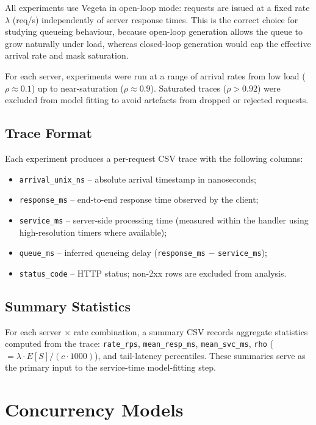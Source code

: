 All experiments use Vegeta in open-loop mode: requests are issued at a fixed rate $\lambda$ (req/s) independently of server response times. This is the correct choice for studying queueing behaviour, because open-loop generation allows the queue to grow naturally under load, whereas closed-loop generation would cap the effective arrival rate and mask saturation.

For each server, experiments were run at a range of arrival rates from low load ($\rho \approx 0.1$) up to near-saturation ($\rho \approx 0.9$). Saturated traces ($\rho > 0.92$) were excluded from model fitting to avoid artefacts from dropped or rejected requests.

\subsection{Trace Format}

Each experiment produces a per-request CSV trace with the following columns:

\begin{itemize}
    \item \texttt{arrival\_unix\_ns} -- absolute arrival timestamp in nanoseconds;
    \item \texttt{response\_ms} -- end-to-end response time observed by the client;
    \item \texttt{service\_ms} -- server-side processing time (measured within the handler using high-resolution timers where available);
    \item \texttt{queue\_ms} -- inferred queueing delay (\texttt{response\_ms} $-$ \texttt{service\_ms});
    \item \texttt{status\_code} -- HTTP status; non-2xx rows are excluded from analysis.
\end{itemize}

\subsection{Summary Statistics}

For each server $\times$ rate combination, a summary CSV records aggregate statistics computed from the trace: \texttt{rate\_rps}, \texttt{mean\_resp\_ms}, \texttt{mean\_svc\_ms}, \texttt{rho} ($= \lambda \cdot E[S] / (c \cdot 1000)$), and tail-latency percentiles. These summaries serve as the primary input to the service-time model-fitting step.

\section{Concurrency Models}
\label{sec:concurrency}

